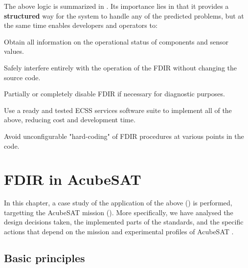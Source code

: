 \documentclass[a4paper,nobib]{tufte-book}
\begin{document}
The above logic is summarized in . Its importance lies in that it provides a \textbf{structured} way for the system to handle any of the predicted problems, but at the same time enables developers and operators to:
\begin{compactitem}
	\item Obtain all information on the operational status of components and sensor values.
	\item Safely interfere entirely with the operation of the \acs{FDIR} without changing the source code.
	\item Partially or completely disable \acs{FDIR} if necessary for diagnostic purposes.
	\item Use a ready and tested \acs{ECSS} services software suite to implement all of the above, reducing cost and development time.
	\item Avoid unconfigurable "hard-coding" of \acs{FDIR} procedures at various points in the code.
\end{compactitem}

\chapter{\acs{FDIR} in AcubeSAT}
\label{cap:acufdir}

In this chapter, a case study of the application of the above () is performed, targetting the AcubeSAT mission (). More specifically, we have analysed the design decisions taken, the implemented parts of the standards, and the specific actions that depend on the mission and experimental profiles of AcubeSAT \autocite{FMEA}.


\section{Basic principles}
\label{sec:fdirbaspri}
\end{document}
